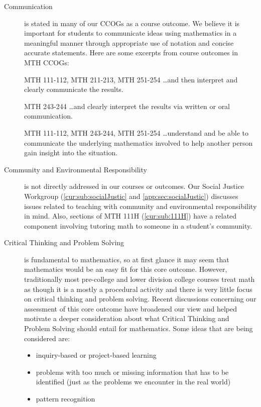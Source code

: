 \begin{description}
\item[Communication] is stated in many of our CCOGs as a course outcome. We
  believe it is important for students to communicate ideas using mathematics in
  a meaningful manner through appropriate use of notation and concise accurate
  statements.  Here are some excerpts from course outcomes in MTH CCOGs: 
\begin{aquote}{MTH 111-112, MTH 211-213, MTH 251-254}
{\ldots}and then interpret and clearly communicate the results. 
\end{aquote}

\begin{aquote}{MTH 243-244}
{\ldots}and clearly interpret the results via written or oral communication. 
\end{aquote}

\begin{aquote}{MTH 111-112, MTH 243-244, MTH 251-254}
{\ldots}understand and be able to communicate the underlying mathematics
involved to help another person gain insight into the situation.
\end{aquote}

\item[Community and Environmental Responsibility] is not directly addressed in
  our courses or outcomes. Our Social Justice Workgroup
  (\vref{cur:sub:socialJustic} and \vref{app:sec:socialJustic}) discusses issues
  related to teaching with community and environmental responsibility in mind.
  Also, sections of MTH 111H (\vref{cur:sub:111H}) have a related component
  involving tutoring math to someone in a student's community. 

\item[Critical Thinking and Problem Solving] is fundamental to mathematics, so
  at first glance it may seem that mathematics would be an easy fit for this
  core outcome.  However, traditionally most pre-college and lower division
  college courses treat math as though it is a mostly a procedural activity and
  there is very little focus on critical thinking and problem solving.  Recent
  discussions concerning our assessment of this core outcome have broadened our
  view and helped motivate a deeper consideration about what Critical Thinking
  and Problem Solving should entail for mathematics.  Some ideas that are being
  considered are:
\begin{itemize}
\item inquiry-based or project-based learning
\item problems with too much or missing information that has to be identified
  (just as the problems we encounter in the real world)
\item pattern recognition
\end{itemize}


\end{description}
